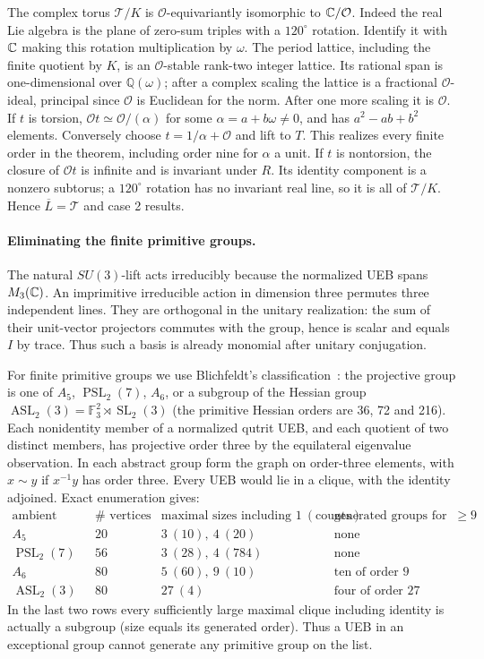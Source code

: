 \documentclass[10pt]{article}
\newcommand{\T}{\mathcal T}\DeclareMathOperator{\Tr}{Tr}\DeclareMathOperator{\Ad}{Ad}
\begin{document}
The complex torus $\T/K$ is $\mathcal O$-equivariantly isomorphic to $\mathbb C/\mathcal O$. Indeed the real Lie algebra is the plane of zero-sum triples with a $120^\circ$ rotation. Identify it with $\mathbb C$ making this rotation multiplication by $\omega$. The period lattice, including the finite quotient by $K$, is an $\mathcal O$-stable rank-two integer lattice. Its rational span is one-dimensional over $\mathbb Q(\omega)$; after a complex scaling the lattice is a fractional $\mathcal O$-ideal, principal since $\mathcal O$ is Euclidean for the norm. After one more scaling it is $\mathcal O$. If $t$ is torsion, $\mathcal O t\simeq\mathcal O/(\alpha)$ for some $\alpha=a+b\omega\ne0$, and has $a^2-ab+b^2$ elements. Conversely choose $t=1/\alpha+\mathcal O$ and lift to $T$. This realizes every finite order in the theorem, including order nine for $\alpha$ a unit. If $t$ is nontorsion, the closure of $\mathcal O t$ is infinite and is invariant under $R$. Its identity component is a nonzero subtorus; a $120^\circ$ rotation has no invariant real line, so it is all of $\T/K$. Hence $\overline L=\T$ and case 2 results.

\paragraph{Eliminating the finite primitive groups.}
The natural $SU(3)$-lift acts irreducibly because the normalized UEB spans $M_3(\mathbb C)$. An imprimitive irreducible action in dimension three permutes three independent lines. They are orthogonal in the unitary realization: the sum of their unit-vector projectors commutes with the group, hence is scalar and equals $I$ by trace. Thus such a basis is already monomial after unitary conjugation.

For finite primitive groups we use Blichfeldt's classification~\cite{Blich}: the projective group is one of $A_5$, $\operatorname{PSL}_2(7)$, $A_6$, or a subgroup of the Hessian group $\operatorname{ASL}_2(3)=\mathbb F_3^2\rtimes\operatorname{SL}_2(3)$ (the primitive Hessian orders are 36, 72 and 216). Each nonidentity member of a normalized qutrit UEB, and each quotient of two distinct members, has projective order three by the equilateral eigenvalue observation. In each abstract group form the graph on order-three elements, with $x\sim y$ if $x^{-1}y$ has order three. Every UEB would lie in a clique, with the identity adjoined. Exact enumeration gives:
\[
\begin{array}{c|r|l|l}
 \text{ambient group}&\#\text{ vertices}&\text{maximal sizes including }1\ (\text{counts})&
 \text{generated groups for size}\ge9\\\hline
 A_5&20&3\ (10),\ 4\ (20)&\text{none}\\
 \operatorname{PSL}_2(7)&56&3\ (28),\ 4\ (784)&\text{none}\\
 A_6&80&5\ (60),\ 9\ (10)&\text{ten of order }9\\
 \operatorname{ASL}_2(3)&80&27\ (4)&\text{four of order }27
\end{array}
\]
In the last two rows every sufficiently large maximal clique including identity is actually a subgroup (size equals its generated order). Thus a UEB in an exceptional group cannot generate any primitive group on the list.
\end{document}

